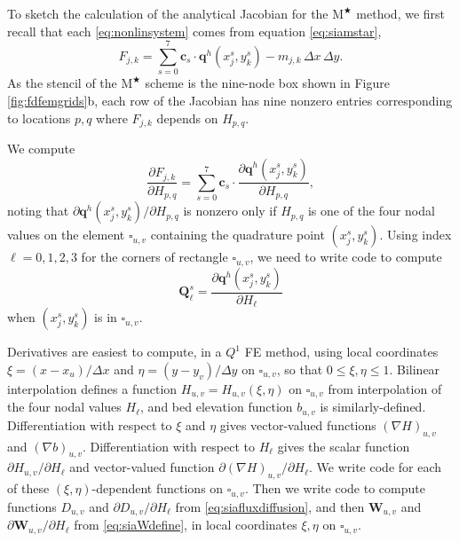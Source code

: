 \documentclass[review,letterpaper]{igs}
\newcommand\bc{\mathbf{c}}
\newcommand\bq{\mathbf{q}}
\newcommand\bQ{\mathbf{Q}}
\newcommand\bW{\mathbf{W}}
\newcommand{\grad}{\nabla}
\newcommand{\Mstar}{$\text{M}^{\bigstar}$\xspace}
\begin{document}
To sketch the calculation of the analytical Jacobian for the \Mstar method, we first recall that each \eqref{eq:nonlinsystem} comes from equation \eqref{eq:siamstar},
\begin{equation}
  F_{j,k} = \sum_{s=0}^7 \bc_s\cdot \bq^h(x_j^s,y_k^s) - m_{j,k}\,\Delta x\,\Delta y.  \label{eq:res}
\end{equation}
As the stencil of the \Mstar scheme is the nine-node box shown in Figure \ref{fig:fdfemgrids}b, each row of the Jacobian has nine nonzero entries corresponding to locations $p,q$ where $F_{j,k}$ depends on $H_{p,q}$.

We compute
\begin{equation}
\frac{\partial F_{j,k}}{\partial H_{p,q}} = \sum_{s=0}^7 \bc_s\cdot \frac{\partial \bq^h(x_j^s,y_k^s)}{\partial H_{p,q}}, \label{eq:jacQsum}
\end{equation}
noting that $\partial \bq^h(x_j^s,y_k^s)/\partial H_{p,q}$ is nonzero only if $H_{p,q}$ is one of the four nodal values on the element $\square_{u,v}$ containing the quadrature point $(x_j^s,y_k^s)$.  Using index $\ell=0,1,2,3$ for the corners of rectangle $\square_{u,v}$, we need to write code to compute
\begin{equation}
\bQ_\ell^s = \frac{\partial \bq^h(x_j^s,y_k^s)}{\partial H_\ell} \label{eq:jacthegoal}
\end{equation}
when $(x_j^s,y_k^s)$ is in $\square_{u,v}$.

\newcommand{\uppoint}{(\xi_{\text{up}}^s,\eta_{\text{up}}^s)}
Derivatives are easiest to compute, in a $Q^1$ FE method, using local coordinates $\xi=(x-x_u)/\Delta x$ and $\eta=(y-y_v)/\Delta y$ on $\square_{u,v}$, so that $0\le \xi,\eta \le 1$.  Bilinear interpolation defines a function $H_{u,v}=H_{u,v}(\xi,\eta)$ on $\square_{u,v}$ from interpolation of the four nodal values $H_\ell$, and bed elevation function $b_{u,v}$ is similarly-defined.  Differentiation with respect to $\xi$ and $\eta$ gives vector-valued functions $(\grad H)_{u,v}$ and $(\grad b)_{u,v}$.  Differentiation with respect to $H_\ell$ gives the scalar function $\partial H_{u,v}/\partial H_\ell$ and vector-valued function $\partial (\grad H)_{u,v}/\partial H_\ell$.  We write code for each of these $(\xi,\eta)$-dependent functions on $\square_{u,v}$.  Then we write code to compute functions $D_{u,v}$ and $\partial D_{u,v}/\partial H_\ell$ from \eqref{eq:siafluxdiffusion}, and then $\bW_{u,v}$ and $\partial \bW_{u,v}/\partial H_\ell$ from \eqref{eq:siaWdefine}, in local coordinates $\xi,\eta$ on $\square_{u,v}$.
\end{document}

